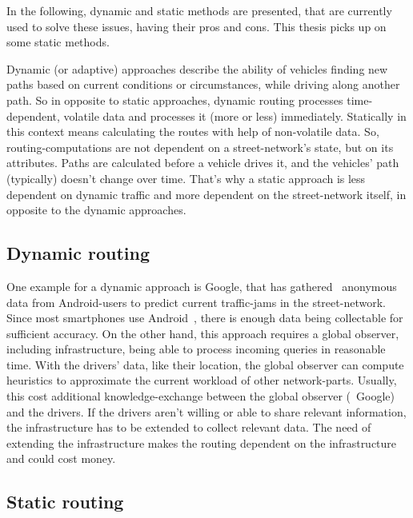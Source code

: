     In the following, dynamic and static methods are presented, that are currently used to solve these issues, having their pros and cons.
    This thesis picks up on some static methods.

    Dynamic (or adaptive) approaches describe the ability of vehicles finding new paths based on current conditions or circumstances, while driving along another path.
    So in opposite to static approaches, dynamic routing processes time-dependent, volatile data and processes it (more or less) immediately.
    Statically in this context means calculating the routes with help of non-volatile data.
    So, routing-computations are not dependent on a street-network's state, but on its attributes.
    Paths are calculated before a vehicle drives it, and the vehicles' path (typically) doesn't change over time.
    That's why a static approach is less dependent on dynamic traffic and more dependent on the street-network itself, in opposite to the dynamic approaches.

    \subsection{Dynamic routing}

        One example for a dynamic approach is Google, that has gathered~\cite{barth:google-traffic} anonymous data from Android-users to predict current traffic-jams in the street-network.
        Since most smartphones use Android~\cite{kantar:android-vs-ios}, there is enough data being collectable for sufficient accuracy.
        On the other hand, this approach requires a global observer, including infrastructure, being able to process incoming queries in reasonable time.
        With the drivers' data, like their location, the global observer can compute heuristics to approximate the current workload of other network-parts.
        Usually, this cost additional knowledge-exchange between the global observer (\eg\ Google) and the drivers.
        If the drivers aren't willing or able to share relevant information, the infrastructure has to be extended to collect relevant data.
        The need of extending the infrastructure makes the routing dependent on the infrastructure and could cost money.

    \subsection{Static routing}

